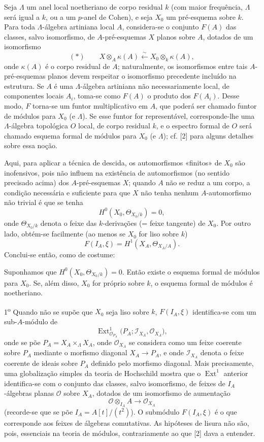 Seja $\Lambda$ um anel local noetheriano de corpo residual $k$ (com maior
frequência, $\Lambda$ será igual a $k$, ou a um $p$-anel de Cohen), e seja
$X_0$ um pré-esquema sobre $k$. Para toda $\Lambda$-álgebra artiniana local $A$,
considera-se o conjunto $F(A)$ das classes, salvo isomorfismo, de
$A$-pré-esquemas $X$ planos sobre $A$, dotados de um isomorfismo
\[
  (*)\qquad
  X\otimes_A\kappa(A)\xleftarrow{\sim}
  X_0\otimes_k\kappa(A),
\]
onde $\kappa(A)$ é o corpo residual de $A$; naturalmente, os isomorfismos
entre tais $A$-pré-esquemas planos devem respeitar o isomorfismo precedente
incluído na estrutura. Se $A$ é uma $\Lambda$-álgebra artiniana não
necessariamente local, de componentes locais $A_i$, toma-se como $F(A)$ o
produto dos $F(A_i)$. Desse modo, $F$ torna-se um funtor
multiplicativo em $A$, que poderá ser chamado funtor de módulos para $X_0$ (e
$\Lambda$). Se esse funtor for representável, corresponde-lhe uma
$\Lambda$-álgebra topológica $O$ local, de corpo residual $k$, e o espectro
formal de $O$ será chamado esquema formal de módulos para $X_0$ (e $\Lambda$);
cf. [2] para alguns detalhes sobre essa noção.

Aqui, para aplicar a técnica de descida, os automorfismos «finitos» de $X_0$
são inofensivos, pois não influem na existência de automorfismos (no
sentido precisado acima) dos $A$-pré-esquemas $X$; quando $A$ não se
reduz a um corpo, a condição necessária e suficiente para que $X$ não tenha
nenhum $A$-automorfismo não trivial é que se tenha
\[
  H^0(X_0,\Theta_{X_0/k})=0,
\]
onde $\Theta_{X_0/k}$ denota o feixe das $k$-derivações (= feixe tangente)
de $X_0$. Por outro lado, obtém-se facilmente (ao menos se $X_0$ for liso
sobre $k$)
\[
  F(I_A,\xi)=H^1(X_A,\Theta_{X_A/A}).
\]
Conclui-se então, como de costume:

 Suponhamos que
$H^0(X_0,\Theta_{X_0/k})=0$. Então existe o esquema formal de módulos para
$X_0$. Se, além disso, $X_0$ for próprio sobre $k$, o esquema formal de módulos é
noetheriano.

 1\textsuperscript{o} Quando não se supõe que $X_0$ seja
liso sobre $k$, $F(I_A,\xi)$ identifica-se com um sub-$A$-módulo de
\[
  \operatorname{Ext}^1_{\mathcal O_{P_A}}
  \bigl(P_A;\mathcal I_{X_A},\mathcal O_{X_A}\bigr),
\]
onde se põe $P_A=X_A\times_\Lambda X_A$, onde $\mathcal O_{X_A}$ se
considera como um feixe coerente sobre $P_A$ mediante o morfismo diagonal
$X_A\longrightarrow P_A$, e onde $\mathcal I_{X_A}$ denota o feixe coerente
de ideais sobre $P_A$ definido pelo morfismo diagonal. Mais precisamente,
uma globalização simples da teoria de Hochschild mostra que o
$\operatorname{Ext}^1$ anterior identifica-se com o conjunto das classes,
salvo isomorfismo, de feixes de $I_A$-álgebras planas $\mathcal O$ sobre $X_A$,
dotados de um isomorfismo de aumentação
\[
  \mathcal O\otimes_{I_A}A\longrightarrow\mathcal O_{X_A}
\]
(recorde-se que se põe $I_A=A[t]/(t^2)$). O submódulo $F(I_A,\xi)$ é o
que corresponde aos feixes de álgebras comutativas. As hipóteses de lisura
não são, pois, essenciais na teoria de módulos, contrariamente ao que [2]
dava a entender.

